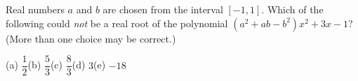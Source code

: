 Real numbers $a$ and $b$ are chosen from the interval $[-1,1]$. Which of the following could \emph{not} be a real root of the polynomial $\left(a^2+ab-b^2\right)x^2+3x-1$? (More than one choice may be correct.)

(a) $\dfrac{1}{2}$\quad (b) $\dfrac{5}{3}$\quad (c) $\dfrac{8}{3}$\quad (d) $3$\quad (e) $-18$
